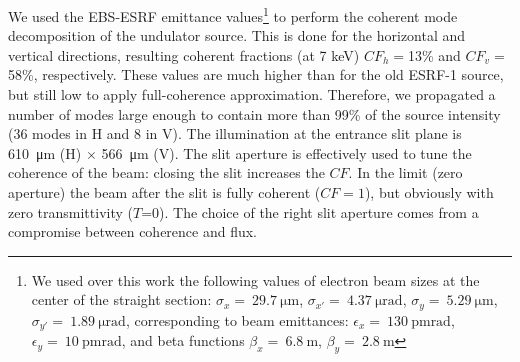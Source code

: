 \documentclass[9pt,twocolumn,twoside]{osajnl}
\begin{document}
We used the EBS-ESRF emittance values\footnote{We used over this work the following values of electron beam sizes at the center of the straight section: $\sigma_x=~\SI{29.7}{\micro\meter}$,
$\sigma_{x'}=~\SI{4.37}{\micro\radian}$,
$\sigma_y=~\SI{5.29}{\micro\meter}$,
$\sigma_{y'}=~\SI{1.89}{\micro\radian}$, corresponding to beam emittances:  $\epsilon_x=~\SI{130}{\pico\meter \radian}$,
$\epsilon_y=~\SI{10}{\pico\meter \radian}$, and beta functions
$\beta_x=~\SI{6.8}{\meter}$,
$\beta_y=~\SI{2.8}{\meter}$
}
to perform the coherent mode decomposition of the undulator source.
This is done for the horizontal and vertical directions, resulting coherent fractions (at 7 keV) $CF_h=$13\% and $CF_v=$58\%, respectively. These values are much higher than for the old ESRF-1 source, but still low to apply full-coherence approximation. Therefore, we propagated a number of modes large enough to contain more than 99\% of the source intensity (36 modes in H and 8 in V). The illumination at the entrance slit plane is \SI{610}{\micro\meter} (H) $\times$ \SI{566}{\micro\meter} (V). The slit aperture is effectively used to tune the coherence of the beam: closing the slit increases the $CF$. In the limit (zero aperture) the beam after the slit is fully coherent ($CF=1$), but obviously with zero transmittivity ($T$=0). The choice of the right slit aperture comes from a compromise between coherence and flux.  

\end{document}
